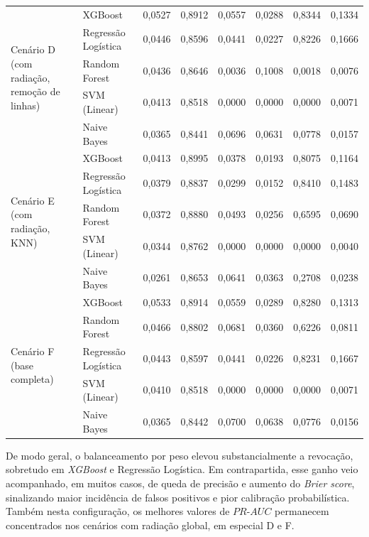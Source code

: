 \begin{longtable}{p{3.2cm} l c c c c c c}
\multirow{5}{*}{\parbox{3.2cm}{\centering Cenário D\\(com radiação, remoção de linhas)}} 
   & XGBoost             & 0,0527 & 0,8912 & 0,0557 & 0,0288 & 0,8344 & 0,1334 \\
   & Regressão Logística & 0,0446 & 0,8596 & 0,0441 & 0,0227 & 0,8226 & 0,1666 \\
   & Random Forest       & 0,0436 & 0,8646 & 0,0036 & 0,1008 & 0,0018 & 0,0076 \\
   & SVM (Linear)        & 0,0413 & 0,8518 & 0,0000 & 0,0000 & 0,0000 & 0,0071 \\
   & Naive Bayes         & 0,0365 & 0,8441 & 0,0696 & 0,0631 & 0,0778 & 0,0157 \\
\midrule

\multirow{5}{*}{\parbox{3.2cm}{\centering Cenário E\\(com radiação, KNN)}} 
   & XGBoost             & 0,0413 & 0,8995 & 0,0378 & 0,0193 & 0,8075 & 0,1164 \\
   & Regressão Logística & 0,0379 & 0,8837 & 0,0299 & 0,0152 & 0,8410 & 0,1483 \\
   & Random Forest       & 0,0372 & 0,8880 & 0,0493 & 0,0256 & 0,6595 & 0,0690 \\
   & SVM (Linear)        & 0,0344 & 0,8762 & 0,0000 & 0,0000 & 0,0000 & 0,0040 \\
   & Naive Bayes         & 0,0261 & 0,8653 & 0,0641 & 0,0363 & 0,2708 & 0,0238 \\
\midrule

\multirow{5}{*}{\parbox{3.2cm}{\centering Cenário F\\(base completa)}} 
   & XGBoost             & 0,0533 & 0,8914 & 0,0559 & 0,0289 & 0,8280 & 0,1313 \\
   & Random Forest       & 0,0466 & 0,8802 & 0,0681 & 0,0360 & 0,6226 & 0,0811 \\
   & Regressão Logística & 0,0443 & 0,8597 & 0,0441 & 0,0226 & 0,8231 & 0,1667 \\
   & SVM (Linear)        & 0,0410 & 0,8518 & 0,0000 & 0,0000 & 0,0000 & 0,0071 \\
   & Naive Bayes         & 0,0365 & 0,8442 & 0,0700 & 0,0638 & 0,0776 & 0,0156 \\
\end{longtable}
\endgroup

De modo geral, o balanceamento por peso elevou substancialmente a revocação, sobretudo em \textit{XGBoost} e Regressão Logística. Em contrapartida, esse ganho veio acompanhado, em muitos casos, de queda de precisão e aumento do \textit{Brier score}, sinalizando maior incidência de falsos positivos e pior calibração probabilística. Também nesta configuração, os melhores valores de $PR\text{-}AUC$ permanecem concentrados nos cenários com radiação global, em especial D e F.

